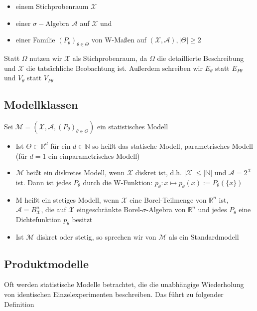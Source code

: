 \documentclass[a4paper,11pt]{scrartcl}
\begin{document}
    
\begin{itemize}
    \item einem Stichprobenraum $\mathcal{X}$
    \item einer $\sigma-$Algebra $\mathcal{A}$ auf $\mathcal{X}$ und
    \item einer Familie $(P_\theta)_{\theta \in \Theta }$ von W-Maßen auf $(\mathcal{X,A}), |\Theta| \geq 2$
\end{itemize}
Statt $\Omega$ nutzen wir $\mathcal{X}$ als Stichprobenraum, da $\Omega$ die detaillierte Beschreibung und $\mathcal{X}$ die tatsächliche Beobachtung ist.
Außerdem schreiben wir $E_\theta$ statt $E_{P\theta}$ und $V_\theta$ statt $V_{P\theta}$

\subsection{Modellklassen}
Sei $\mathcal{M} =(\mathcal{X},\mathcal{A}, (P_\theta)_{\theta \in \Theta })$ ein statistisches Modell

\begin{itemize}
    \item Ist $\Theta \subset \mathbb{R}^d$ für ein $ d \in \mathbb{N}$ so heißt das statische Modell, parametrisches Modell (für $d=1$ ein einparametrisches Modell)
    \item $\mathcal{M}$ heißt ein diskretes Modell, wenn $\mathcal{X}$ diskret ist, d.h. $|\mathcal{X}| \leq |\mathbb{N}|$ und $\mathcal{A} = 2^\mathcal{X}$ ist.
    Dann ist jedes $P_\theta$ durch die W-Funktion: $p_\theta: x \mapsto p_\theta(x) := P_\theta(\{x\})$
    \item M heißt ein stetiges Modell, wenn $\mathcal{X}$ eine Borel-Teilmenge von $\mathbb{R}^n$ ist, $\mathcal{A} = B_\mathcal{X}^n$, die auf $\mathcal{X}$ eingeschränkte Borel-$\sigma$-Algebra von $\mathbb{R}^n$ und jedes $P_\theta$ eine Dichtefunktion $p_\theta$ besitzt
    \item Ist $\mathcal{M}$ diskret oder stetig, so sprechen wir von $\mathcal{M}$ als ein Standardmodell
\end{itemize}

\subsection{Produktmodelle}
Oft werden statistische Modelle betrachtet, die die unabhängige Wiederholung von identischen Einzelexperimenten beschreiben.
Das führt zu folgender Definition
\end{document}
